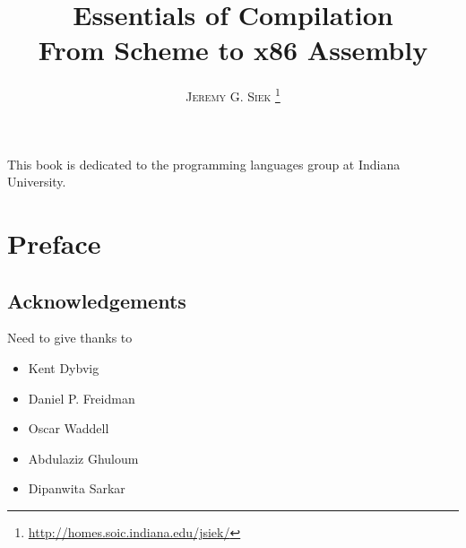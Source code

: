 \documentclass[10pt]{book}
\title{\Huge \textbf{Essentials of Compilation} \\ 
  \huge From Scheme to x86 Assembly}
\author{\textsc{Jeremy G. Siek}
   \thanks{\url{http://homes.soic.indiana.edu/jsiek/}}
   }
\newenvironment{dedication}
{
   \cleardoublepage
   \thispagestyle{empty}
   \vspace*{\stretch{1}}
   \hfill\begin{minipage}[t]{0.66\textwidth}
   \raggedright
}
{
   \end{minipage}
   \vspace*{\stretch{3}}
   \clearpage
}
\begin{document}
\frontmatter
\maketitle

\begin{dedication}
This book is dedicated to the programming languages group at Indiana University.
\end{dedication}

\tableofcontents

\mainmatter

\chapter*{Preface}

\cite{Sarkar:2004fk}
\cite{Keep:2012aa}
\cite{Ghuloum:2006bh}



\section*{Acknowledgements}

Need to give thanks to 
\begin{itemize}
\item Kent Dybvig
\item Daniel P. Freidman
\item Oscar Waddell
\item Abdulaziz Ghuloum
\item Dipanwita Sarkar
\end{itemize}
\end{document}
